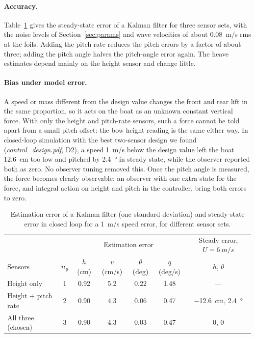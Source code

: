 \documentclass[11pt,a4paper]{article}
\begin{document}
\paragraph{Accuracy.} Table~\ref{tab:sensors} gives the steady-state error of a
Kalman filter for three sensor sets, with the noise levels of Section~\ref{sec:params} and
wave velocities of about \SI{0.08}{m/s} rms at the foils. Adding the pitch rate
reduces the pitch errors by a factor of about three; adding the pitch angle
halves the pitch-angle error again. The heave estimates depend mainly on the
height sensor and change little.

\paragraph{Bias under model error.} A speed or mass different from the design value changes the front and rear lift
in the same proportion, so it acts on the boat as an unknown constant vertical
force. With only the height and pitch-rate sensors, such a force cannot be told
apart from a small pitch offset: the bow height reading is the same either way.
In closed-loop simulation with the best two-sensor design we found
(\emph{control\_design.pdf}, D2), a speed
\SI{1}{m/s} below the design value left the boat \SI{12.6}{cm} too low and
pitched by \SI{2.4}{\degree} in steady state, while the observer reported both
as zero. No observer tuning removed this. Once the pitch angle is measured, the
force becomes clearly observable: an observer with one extra state for the
force, and integral action on height and pitch in the controller, bring both
errors to zero.

\begin{table}[h]
\centering
\caption{Estimation error of a Kalman filter (one standard deviation) and
steady-state error in closed loop for a \SI{1}{m/s} speed error, for different
sensor sets.}
\label{tab:sensors}
\small
\begin{tabular}{@{}lcccccc@{}}
\toprule
 & & \multicolumn{4}{c}{Estimation error} & Steady error, $U=\SI{6}{m/s}$ \\
Sensors & $n_y$ & $h$ (cm) & $v$ (cm/s) & $\theta$ (deg) & $q$ (deg/s) & $h$, $\theta$ \\ \midrule
Height only & 1 & 0.92 & 5.2 & 0.22 & 1.48 & --- \\
Height + pitch rate & 2 & 0.90 & 4.3 & 0.06 & 0.47 & \SI{-12.6}{cm}, \SI{2.4}{\degree} \\
All three (chosen) & 3 & 0.90 & 4.3 & 0.03 & 0.47 & 0, 0 \\
\bottomrule
\end{tabular}
\end{table}
\end{document}
